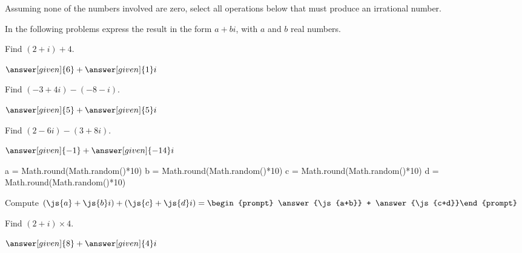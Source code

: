 \documentclass[nooutcomes]{ximera}
\begin{document}
\begin{problem}
Assuming none of the numbers involved are zero, select all operations below that must produce an irrational number.

\begin{selectAll}
\end{selectAll}
\end{problem}

In the following problems express the result in the form $a+bi$, with $a$ and $b$ real numbers.  

\begin{problem}
Find $(2+i) + 4$.
\begin{prompt}
	$\answer[given]{6} + \answer[given]{1}i$
\end{prompt}
\end{problem}


\begin{problem}
Find $(-3+4i) - (-8 - i)$.
\begin{prompt}
	$\answer[given]{5} + \answer[given]{5}i$
\end{prompt}
\end{problem}


\begin{problem}
Find $(2-6i) - (3+8i)$.
\begin{prompt}
	$\answer[given]{-1} + \answer[given]{-14}i$
\end{prompt}
\end{problem}


\begin{javascript}
  a = Math.round(Math.random()*10)
  b = Math.round(Math.random()*10)
  c = Math.round(Math.random()*10)
  d = Math.round(Math.random()*10)
\end{javascript}

\begin{problem}
Compute $(\js{a}+\js{b}i)+(\js{c}+\js{d}i) = \begin{prompt} \answer{\js{a+b}} + \answer{\js{c+d}}\end{prompt}$
\end{problem}


\begin{problem}
Find $(2+i) \times 4$.
\begin{prompt}
	$\answer[given]{8} + \answer[given]{4}i$
\end{prompt}
\end{problem}
\end{document}
